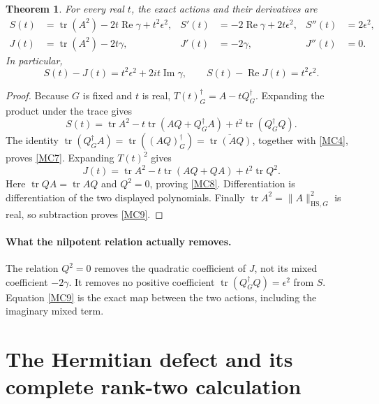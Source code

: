 \documentclass[11pt]{article}
\newtheorem{theorem}{Theorem}
\newcommand{\tr}{\operatorname{tr}}
\newcommand{\Rea}{\operatorname{Re}}
\newcommand{\Ima}{\operatorname{Im}}
\newcommand{\adj}{\dagger_G}
\begin{document}
\begin{theorem}
For every real \(t\), the exact actions and their derivatives are
\begin{align}
 S(t)&=\tr(A^2)-2t\Rea\gamma+t^2\epsilon^2,
 & S'(t)&=-2\Rea\gamma+2t\epsilon^2,
 & S''(t)&=2\epsilon^2, \tag{MC7}\label{MC7}\\
 J(t)&=\tr(A^2)-2t\gamma,
 & J'(t)&=-2\gamma,
 & J''(t)&=0. \tag{MC8}\label{MC8}
\end{align}
In particular,
\begin{equation}
 S(t)-J(t)=t^2\epsilon^2+2it\Ima\gamma,\qquad
 S(t)-\Rea J(t)=t^2\epsilon^2.
 \tag{MC9}\label{MC9}
\end{equation}
\end{theorem}
\begin{proof}
Because \(G\) is fixed and \(t\) is real,
\(T(t)^\adj=A-tQ^\adj\). Expanding the product under the trace gives
\[
 S(t)=\tr A^2-t\tr(AQ+Q^\adj A)+t^2\tr(Q^\adj Q).
\]
The identity
\(\tr(Q^\adj A)=\tr((AQ)^\adj)=\overline{\tr(AQ)}\),
together with \eqref{MC4}, proves \eqref{MC7}. Expanding \(T(t)^2\)
gives
\[
 J(t)=\tr A^2-t\tr(AQ+QA)+t^2\tr Q^2.
\]
Here \(\tr QA=\tr AQ\) and \(Q^2=0\), proving \eqref{MC8}.
Differentiation is differentiation of the two displayed polynomials.
Finally \(\tr A^2=\|A\|_{\mathrm{HS},G}^2\) is real, so subtraction
proves \eqref{MC9}.
\end{proof}

\paragraph{What the nilpotent relation actually removes.}
The relation \(Q^2=0\) removes the quadratic coefficient of \(J\), not
its mixed coefficient \(-2\gamma\). It removes no positive coefficient
\(\tr(Q^\adj Q)=\epsilon^2\) from \(S\). Equation \eqref{MC9} is
the exact map between the two actions, including the imaginary mixed term.

\section{The Hermitian defect and its complete rank-two calculation}
\end{document}
